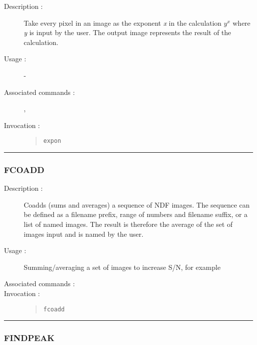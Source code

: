 \begin{description}

\item[Description :] Take every pixel in an image as the exponent {\it x} in the
calculation $y^{x}$ where {\it y} is input by the user. The output image
represents the result of the calculation.

\item[Usage :] -

\item[Associated commands :] {\tt {}},
{\tt {}}

\item[Invocation :]

\begin{quote}{\tt  expon }\end{quote}

\end{description}

\hrule
\subsubsection*{\label{FCOADD}FCOADD}

\begin{description}

\item[Description :] Coadds (sums and averages) a sequence of NDF
images.  The sequence can be defined as a filename prefix, range of
numbers and filename suffix, or a list of named images.  The result is
therefore the average of the set of images input and is named by the
user.

\item[Usage :] Summing/averaging a set of images to increase S/N, for example

\item[Associated commands :] {\tt {}}

\item[Invocation :]

\begin{quote}{\tt  fcoadd }\end{quote}

\end{description}

\hrule
\subsubsection*{\label{FINDPEAK}FINDPEAK}

